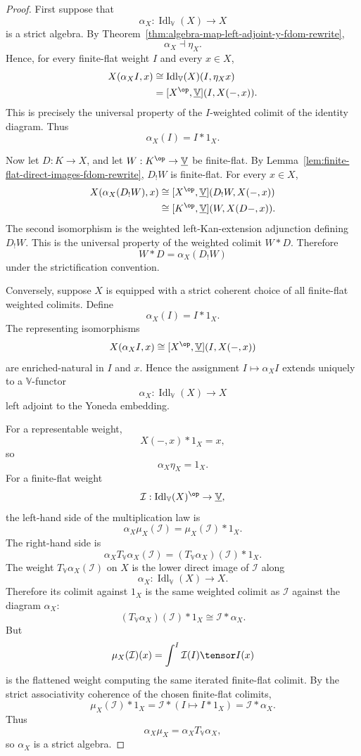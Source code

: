 \begin{proof}
First suppose that
\[
    \alpha_X:\operatorname{Idl}_{\mathbb V}(X)\to X
\]
is a strict algebra.  By
Theorem~\ref{thm:algebra-map-left-adjoint-y-fdom-rewrite},
\[
    \alpha_X\dashv\eta_X.
\]
Hence, for every finite-flat weight \(I\) and every \(x\in X\),
\[
\begin{aligned}
    X(\alpha_XI,x)
    &\cong
    \operatorname{Idl}_{\mathbb V}(X)(I,\eta_Xx)
    \\
    &=
    [X^{\op},\underline{\mathbb V}](I,X(-,x)).
\end{aligned}
\]
This is precisely the universal property of the \(I\)-weighted colimit of the
identity diagram.  Thus
\[
    \alpha_X(I)=I*1_X.
\]

Now let \(D:K\to X\), and let \(W:K^{\op}\to\underline{\mathbb V}\) be
finite-flat.  By Lemma~\ref{lem:finite-flat-direct-images-fdom-rewrite},
\(D_!W\) is finite-flat.  For every \(x\in X\),
\[
\begin{aligned}
    X(\alpha_X(D_!W),x)
    &\cong
    [X^{\op},\underline{\mathbb V}](D_!W,X(-,x))
    \\
    &\cong
    [K^{\op},\underline{\mathbb V}](W,X(D-,x)).
\end{aligned}
\]
The second isomorphism is the weighted left-Kan-extension adjunction defining
\(D_!W\).  This is the universal property of the weighted colimit \(W*D\).
Therefore
\[
    W*D=\alpha_X(D_!W)
\]
under the strictification convention.

Conversely, suppose \(X\) is equipped with a strict coherent choice of all
finite-flat weighted colimits.  Define
\[
    \alpha_X(I)=I*1_X.
\]
The representing isomorphisms
\[
    X(\alpha_XI,x)
    \cong
    [X^{\op},\underline{\mathbb V}](I,X(-,x))
\]
are enriched-natural in \(I\) and \(x\).  Hence the assignment
\(I\mapsto\alpha_XI\) extends uniquely to a \(\mathbb V\)-functor
\[
    \alpha_X:\operatorname{Idl}_{\mathbb V}(X)\to X
\]
left adjoint to the Yoneda embedding.

For a representable weight,
\[
    X(-,x)*1_X=x,
\]
so
\[
    \alpha_X\eta_X=1_X.
\]
For a finite-flat weight
\[
    \mathcal I:
    \operatorname{Idl}_{\mathbb V}(X)^{\op}
    \to
    \underline{\mathbb V},
\]
the left-hand side of the multiplication law is
\[
    \alpha_X\mu_X(\mathcal I)
    =
    \mu_X(\mathcal I)*1_X.
\]
The right-hand side is
\[
    \alpha_XT_{\mathbb V}\alpha_X(\mathcal I)
    =
    (T_{\mathbb V}\alpha_X)(\mathcal I)*1_X.
\]
The weight \(T_{\mathbb V}\alpha_X(\mathcal I)\) on \(X\) is the lower direct
image of \(\mathcal I\) along
\[
    \alpha_X:\operatorname{Idl}_{\mathbb V}(X)\to X.
\]
Therefore its colimit against \(1_X\) is the same weighted colimit as
\(\mathcal I\) against the diagram \(\alpha_X\):
\[
    (T_{\mathbb V}\alpha_X)(\mathcal I)*1_X
    \cong
    \mathcal I*\alpha_X.
\]
But
\[
    \mu_X(\mathcal I)(x)
    =
    \int^{I}\mathcal I(I)\tensor I(x)
\]
is the flattened weight computing the same iterated finite-flat colimit.  By the
strict associativity coherence of the chosen finite-flat colimits,
\[
    \mu_X(\mathcal I)*1_X
    =
    \mathcal I*(I\mapsto I*1_X)
    =
    \mathcal I*\alpha_X.
\]
Thus
\[
    \alpha_X\mu_X
    =
    \alpha_XT_{\mathbb V}\alpha_X,
\]
so \(\alpha_X\) is a strict algebra.


\end{proof}
